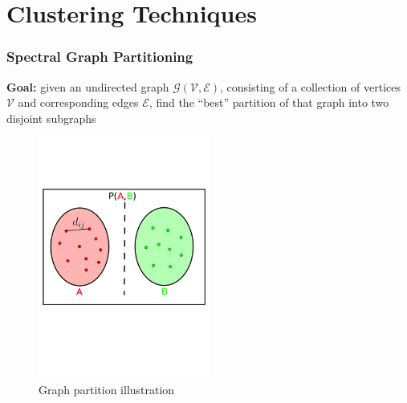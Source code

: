\documentclass[9pt]{beamer}
\begin{document}
\section{Clustering Techniques}
\label{sec-2}
\begin{frame}
\frametitle{Spectral Graph Partitioning}
\label{sec-2-1}

\textbf{Goal:} given an undirected graph
  $\mathcal{G(\mathcal{V},\mathcal{E})}$, consisting of a collection
  of vertices $\mathcal{V}$ and corresponding edges $\mathcal{E}$,
  find the ``best'' partition of that graph into two disjoint subgraphs
  \vspace*{-0.5cm}\begin{figure}
  \includegraphics[width=0.5\textwidth]{GraphPartition.png}
  \caption{Graph partition illustration} \end{figure}
\end{frame}
\end{document}
